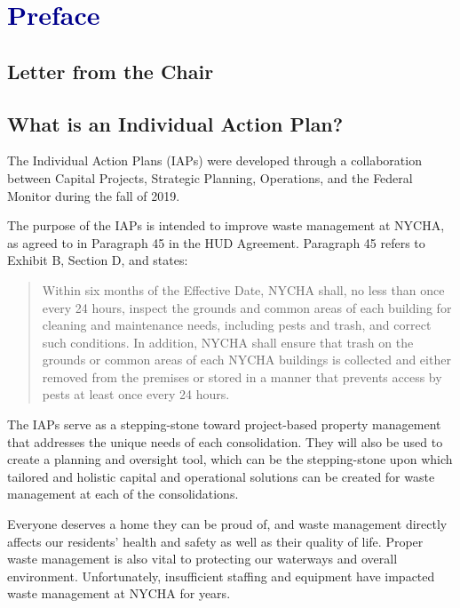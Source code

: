 \chapter{\textcolor{darkBlue}{Preface}}

    \section{Letter from the Chair}\label{sec:Section1}
    \clearpage
    {\selectfont
    \section{What is an Individual Action Plan?}

The Individual Action Plans (IAPs) were developed through a collaboration between Capital Projects, Strategic Planning, Operations, and the Federal Monitor during the fall of 2019. 

The purpose of the IAPs is intended to improve waste management at NYCHA, as agreed to in Paragraph 45 in the HUD Agreement. Paragraph 45 refers to Exhibit B, Section D, and states:

\begin{quote}

Within six months of the Effective Date, NYCHA shall, no less than once every 24 hours, inspect the grounds and common areas of each building for cleaning and maintenance needs, including pests and trash, and correct such conditions. In addition, NYCHA shall ensure that trash on the grounds or common areas of each NYCHA buildings is collected and either removed from the premises or stored in a manner that prevents access by pests at least once every 24 hours.

\end{quote}

The  IAPs serve as a stepping-stone toward project-based property management that addresses the unique needs of each consolidation. They will also be used to create a planning and oversight tool, which can be the stepping-stone upon which tailored and holistic capital and operational solutions can be created for waste management at each of the consolidations.

Everyone deserves a home they can be proud of, and waste management directly affects our residents' health and safety as well as their quality of life. Proper waste management is also vital to protecting our waterways and overall environment. Unfortunately, insufficient staffing and equipment have impacted waste management at NYCHA for years. 

}
